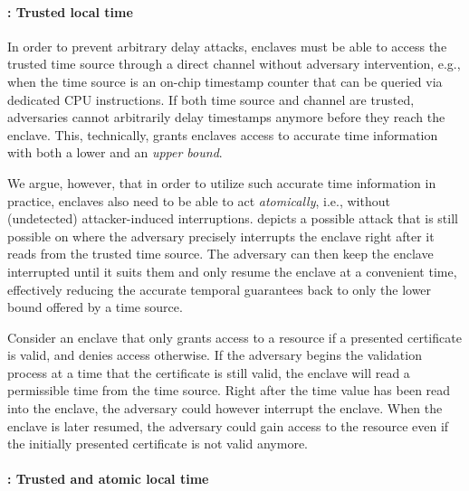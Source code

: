 \documentclass[sigplan,10pt]{acmart}
\begin{document}
\paragraph{\Tthree: Trusted local time}
In order to prevent arbitrary delay attacks, enclaves must be able to access the
trusted time source through a direct channel without adversary intervention,
e.g., when the time source is an on-chip timestamp counter that can be queried
via dedicated CPU instructions.
%
If both time source and channel are trusted, adversaries cannot arbitrarily
delay timestamps anymore before they reach the enclave. This, technically,
grants enclaves access to accurate time information with both a lower and an
\emph{upper bound}.

We argue, however, that in order to utilize such accurate time information in
practice, enclaves also need to be able to act \emph{atomically}, i.e., without
(undetected) attacker-induced interruptions.  depicts a
possible attack that is still possible on \Tthree where the adversary precisely
interrupts the enclave right after it reads from the trusted time source. The
adversary can then keep the enclave interrupted until it suits them and only
resume the enclave at a convenient time, effectively reducing the accurate
temporal guarantees back to only the lower bound offered by a \Ttwo time source.

Consider an enclave that only grants access to a resource if
a presented certificate is valid, and denies access otherwise. If the
adversary begins the validation process at a time that the certificate is still
valid, the enclave will read a permissible time from the time source. Right
after the time value has been read into the enclave, the adversary could however
interrupt the enclave. %
When the enclave is later resumed, the adversary could gain access to the resource even if the initially
presented certificate is not valid anymore.

\paragraph{\Tfour: Trusted and atomic local time}
\end{document}
